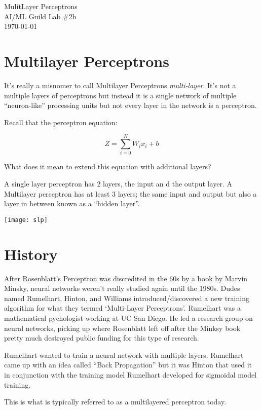 \documentclass[letterpaper,12pt]{article}
\begin{document}
\begin{flushleft}
    MulitLayer Perceptrons\\
    AI/ML Guild Lab \#2b\\
    \today \\
\end{flushleft}

\section{Multilayer Perceptrons}

It's really a misnomer to call Multilayer Perceptrons \emph{multi-layer}. It's
not a multiple layers of perceptrons but instead it is a single network of
multiple ``neuron-like'' processing units but not every layer in the network
is a perceptron.

Recall that the perceptron equation:

\[
    Z = \sum_{i=0}^{N} W_i x_i + b
\]

What does it mean to extend this equation with additional layers?

A single layer perceptron has 2 layers, the input an d the output layer. A
Multilayer perceptron has at least 3 layers; the same input and output but
also a layer in between known as a ``hidden layer''.

\texttt{[image: slp]}

\section{History}

After Rosenblatt's Perceptron was discredited in the 60s by a book by Marvin
Minsky, neural networks weren't really studied again until the 1980s.
Dudes named Rumelhart, Hinton, and Williams introduced/discovered a new
training algorithm for what they termed `Multi-Layer Perceptrons'.
Rumelhart was a mathematical pychologist working at UC San Diego. He led a
research group on neural networks, picking up where Rosenblatt left off after
the Minksy book pretty much destroyed public funding for this type of research.

Rumelhart wanted to train a neural network with multiple layers. Rumelhart
came up with an idea called ``Back Propagation'' but it was Hinton that used it
in conjunction with the training model Rumelhart developed for sigmoidal model
training.

This is what is typically referred to as a multilayered perceptron today.
\end{document}
